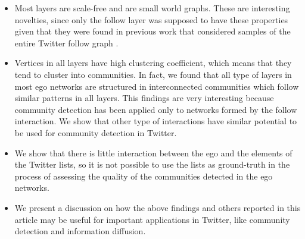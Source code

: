 \begin{itemize}
    \item  Most layers are scale-free and are small world graphs. These are  interesting novelties, since only the follow layer was supposed to have these properties given that they were found in previous work that considered samples of the entire Twitter follow graph \cite{Aparicio2015}.
    

    \item  Vertices in all  layers have high clustering coefficient, which means that they tend to cluster into communities. In fact, we found that all type of layers in most ego networks are structured in interconnected communities which follow similar patterns in all layers. This findings are very interesting because community detection has been applied only to networks formed by the follow interaction. We show that other type of interactions have similar potential to be used for community detection in Twitter.    
    
    
    
    \item We show that there is little interaction between the ego and the elements of the Twitter lists, so it is not possible to use the lists as ground-truth in the process of assessing the quality of the communities detected in the ego networks.
    
    \item  We present a discussion on how the above findings and others reported in this article may be useful for  important applications in Twitter, like community detection and information diffusion.  

\end{itemize}

